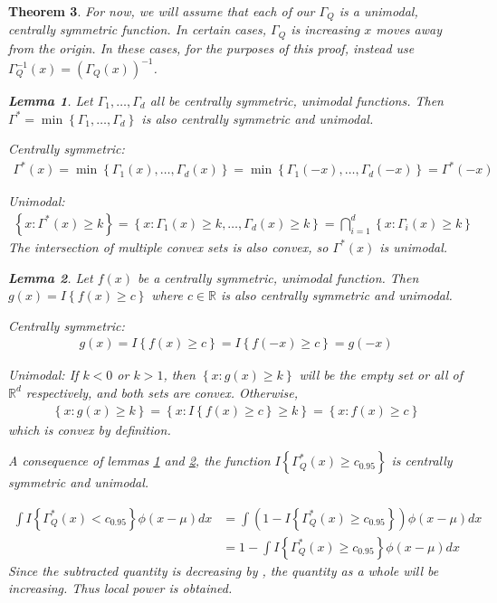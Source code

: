 \documentclass{article}
\newtheorem{theorem}{Theorem}
\newtheorem{lemma}[theorem]{Lemma}
\begin{document}
\begin{theorem}
For now, we will assume that each of our $\Gamma_Q$ is a unimodal, centrally symmetric function.  In certain cases, $\Gamma_Q$ is increasing $x$ moves away from the origin. In these cases, for the purposes of this proof, instead use $\Gamma^{-1}_Q(x) = \left(\Gamma_Q(x)\right)^{-1}$.  

\begin{lemma}
	\label{lemma:min_cent_sym_unm}
	Let $\Gamma_1, \dots, \Gamma_d$ all be centrally symmetric, unimodal functions.  Then $\Gamma^* = \min\left\{\Gamma_1, \dots, \Gamma_d\right\}$ is also centrally symmetric and unimodal.

	Centrally symmetric:
	\begin{align*}
	\Gamma^*(x) = \min\left\{\Gamma_1(x), \dots, \Gamma_d(x)\right\} = \min\left\{\Gamma_1(-x), \dots, \Gamma_d(-x)\right\} = \Gamma^*(-x)
	\end{align*}

	Unimodal:
	\begin{align*}
		\left\{x : \Gamma^*(x) \geq k\right\} = \left\{x : \Gamma_1(x) \geq k, \dots, \Gamma_d(x) \geq k\right\} = \bigcap_{i = 1}^d \left\{x : \Gamma_i(x) \geq k \right\}
	\end{align*}
	The intersection of multiple convex sets is also convex, so $\Gamma^*(x)$ is unimodal.
\end{lemma}

\begin{lemma}
	\label{lemma:indct_cent_sym_unm}
	Let $f(x)$ be a centrally symmetric, unimodal function.  Then $g(x) = I\left\{f(x) \geq c\right\}$ where $c \in \mathbb{R}$ is also centrally symmetric and unimodal. 

	Centrally symmetric:
	\begin{align*}
	g(x) = I\left\{f(x) \geq c\right\} = I\left\{f(-x) \geq c\right\} = g(-x)
	\end{align*}

	Unimodal:
	If $k < 0$ or $k > 1$, then $\left\{x : g(x) \geq k\right\}$ will be the empty set or all of $\mathbb{R}^d$ respectively, and both sets are convex.  Otherwise, 
	\begin{align*}
		\left\{x : g(x) \geq k\right\} = \left\{x : I\left\{f(x) \geq c\right\} \geq k\right\} = \left\{x : f(x) \geq c\right\}
	\end{align*}
	which is convex by definition.
\end{lemma}
A consequence of lemmas \ref{lemma:min_cent_sym_unm} and \ref{lemma:indct_cent_sym_unm}, the function $I\left\{\Gamma^*_Q(x) \geq c_{0.95}\right\}$ is centrally symmetric and unimodal.  

\begin{align*}
	\int I\left\{\Gamma^*_Q(x) < c_{0.95}\right\} \phi(x - \mu) dx &= \int \left(1 - I\left\{\Gamma^*_Q(x) \geq c_{0.95}\right\}\right)\phi(x - \mu) dx
	\\
	&= 1 - \int I\left\{\Gamma^*_Q(x) \geq c_{0.95}\right\} \phi(x - \mu) dx
\end{align*}
Since the subtracted quantity is decreasing by \citep{anderson_integral_1955}, the quantity as a whole will be increasing.  Thus local power is obtained.

\end{theorem}
\end{document}
